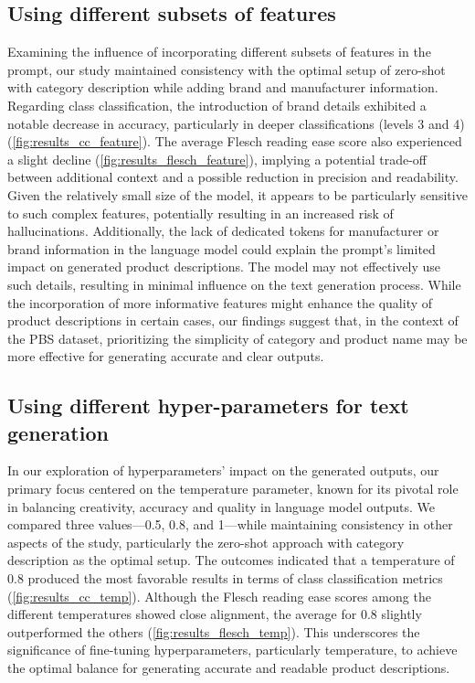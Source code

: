 \subsection{Using different subsets of features}

Examining the influence of incorporating different subsets of features in the prompt, our study maintained consistency with the optimal setup of zero-shot with category description while adding brand and manufacturer information. Regarding class classification, the introduction of brand details exhibited a notable decrease in accuracy, particularly in deeper classifications (levels 3 and 4) (\autoref{fig:results_cc_feature}). The average Flesch reading ease score also experienced a slight decline (\autoref{fig:results_flesch_feature}), implying a potential trade-off between additional context and a possible reduction in precision and readability. Given the relatively small size of the model, it appears to be particularly sensitive to such complex features, potentially resulting in an increased risk of hallucinations. Additionally, the lack of dedicated tokens for manufacturer or brand information in the language model could explain the prompt's limited impact on generated product descriptions. The model may not effectively use such details, resulting in minimal influence on the text generation process. While the incorporation of more informative features might enhance the quality of product descriptions in certain cases, our findings suggest that, in the context of the PBS dataset, prioritizing the simplicity of category and product name may be more effective for generating accurate and clear outputs.


\subsection{Using different hyper-parameters for text generation}

In our exploration of hyperparameters' impact on the generated outputs, our primary focus centered on the temperature parameter, known for its pivotal role in balancing creativity, accuracy and quality in language model outputs. We compared three values—0.5, 0.8, and 1—while maintaining consistency in other aspects of the study, particularly the zero-shot approach with category description as the optimal setup. The outcomes indicated that a temperature of 0.8 produced the most favorable results in terms of class classification metrics (\autoref{fig:results_cc_temp}). Although the Flesch reading ease scores among the different temperatures showed close alignment, the average for 0.8 slightly outperformed the others (\autoref{fig:results_flesch_temp}). This underscores the significance of fine-tuning hyperparameters, particularly temperature, to achieve the optimal balance for generating accurate and readable product descriptions.


